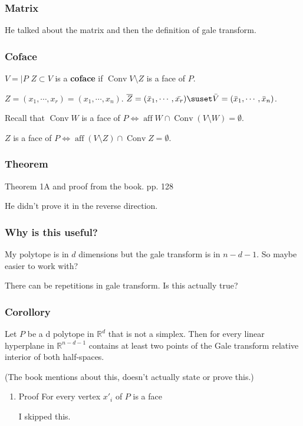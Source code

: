 \documentclass[11pt]{article}
\def\R{\mathbb{R}}
\def\aff{\operatorname{aff}}
\def\conv{\operatorname{Conv}}
\begin{document}
{{{\subsubsection{Matrix}
\label{sec:org9fe543b}
He talked about the matrix and then the definition of gale transform.
\subsubsection{Coface}
\label{sec:org80f0ceb}
\(V = \vert P\) \(Z \subset V\) is a \textbf{coface} if \(\conv V \setminus Z\) is a face
of \(P\).

\(Z = (x_1, \cdots, x_r) = (x_1, \cdots, x_n)\). \(\overline{Z} = (\bar{x}_1,
    \cdots, \bar{x_r}) \suset \bar{V} = (\bar{x}_1, \cdots, \bar{x}_n)\).

Recall that \(\conv W\) is a face of \(P \iff \aff W \cap \conv(V \setminus W) = \emptyset\).

\(Z\) is a face of \(P \iff \aff(V\setminus Z)\cap \conv Z = \emptyset\).
\subsubsection{Theorem}
\label{sec:org9cceabd}
Theorem 1A and proof from the book. pp. 128

He didn't prove it in the reverse direction.
\subsubsection{Why is this useful?}
\label{sec:org4309295}
My polytope is in \(d\) dimensions but the gale transform is in \(n-d - 1\). So
maybe easier to work with?

There can be repetitions in gale transform. Is this actually true?
\subsubsection{Corollory}
\label{sec:orgee22958}
Let \(P\) be a d polytope in \(\R^d\) that is not a simplex. Then for every
linear hyperplane in \(\R^{n - d- 1}\) contains at least two points of the
Gale transform relative interior of both half-spaces.

(The book mentions about this, doesn't actually state or prove this.)
\begin{enumerate}
\item Proof
\label{sec:org71b726e}
For every vertex \(x'_i\) of \(P\) is a face 

I skipped this.
\end{enumerate}
}}}
\end{document}
